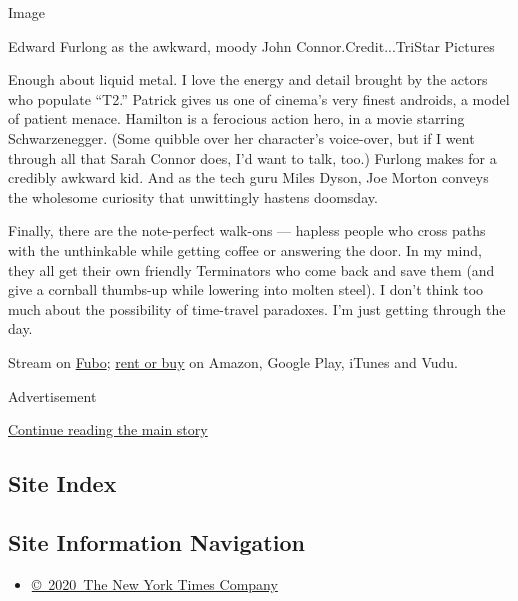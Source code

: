 Image

Edward Furlong as the awkward, moody John Connor.Credit...TriStar
Pictures

Enough about liquid metal. I love the energy and detail brought by the
actors who populate ``T2.'' Patrick gives us one of cinema's very finest
androids, a model of patient menace. Hamilton is a ferocious action
hero, in a movie starring Schwarzenegger. (Some quibble over her
character's voice-over, but if I went through all that Sarah Connor
does, I'd want to talk, too.) Furlong makes for a credibly awkward kid.
And as the tech guru Miles Dyson, Joe Morton conveys the wholesome
curiosity that unwittingly hastens doomsday.

Finally, there are the note-perfect walk-ons --- hapless people who
cross paths with the unthinkable while getting coffee or answering the
door. In my mind, they all get their own friendly Terminators who come
back and save them (and give a cornball thumbs-up while lowering into
molten steel). I don't think too much about the possibility of
time-travel paradoxes. I'm just getting through the day.

Stream on
\href{https://www.fubo.tv/lp/program/MV000336630000/?al=al1\%3Fv\%3D1\%26a\%3Dplay\%26t\%3Dprogram\%26pid\%3DMV000336630000\%26o\%3D0\&irmp=1206980\&irad=599309}{Fubo};
\href{https://www.justwatch.com/us/movie/terminator-2-judgment-day}{rent
or buy} on Amazon, Google Play, iTunes and Vudu.

Advertisement

\protect\hyperlink{after-bottom}{Continue reading the main story}

\hypertarget{site-index}{%
\subsection{Site Index}\label{site-index}}

\hypertarget{site-information-navigation}{%
\subsection{Site Information
Navigation}\label{site-information-navigation}}

\begin{itemize}
\tightlist
\item
  \href{https://help.nytimes.com/hc/en-us/articles/115014792127-Copyright-notice}{©~2020~The
  New York Times Company}
\end{itemize}


